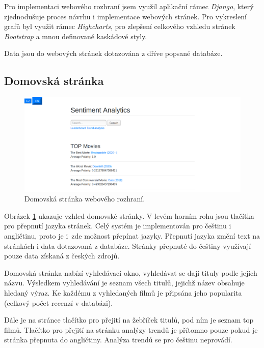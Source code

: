 Pro implementaci webového rozhraní jsem využil aplikační rámec \emph{Django}, který zjednodušuje proces návrhu i implementace webových stránek. Pro vykreslení grafů byl využit rámec \emph{Highcharts}, pro zlepšení celkového vzhledu stránek \emph{Bootstrap} a mnou definované kaskádové styly.

Data jsou do webových stránek dotazována z dříve popsané databáze. 

\subsection{Domovská stránka}
\FloatBarrier
\begin{figure}[!htb]
\label{homepg}
\centering
\includegraphics[width=\textwidth]{homepage.png}
\caption{Domovská stránka webového rozhraní.}
\end{figure}
\FloatBarrier
Obrázek \ref{homepg} ukazuje vzhled domovské stránky. V levém horním rohu jsou tlačítka pro přepnutí jazyka stránek. Celý systém je implementován pro češtinu i angličtinu, proto je i~zde možnost přepínat jazyky. Přepnutí jazyka změní text na stránkách i data dotazovaná z databáze. Stránky přepnuté do češtiny využívají pouze data získaná z českých zdrojů.

Domovská stránka nabízí vyhledávací okno, vyhledávat se dají tituly podle jejich názvu. Výsledkem vyhledávání je seznam všech titulů, jejichž název obsahuje hledaný výraz. Ke každému z vyhledaných filmů je připsána jeho popularita (celkový počet recenzí v databázi). 

Dále je na stránce tlačítko pro přejití na žebříček titulů, pod ním je seznam top filmů. Tlačítko pro přejití na stránku analýzy trendů je přítomno pouze pokud je stránka přepnuta do angličtiny. Analýza trendů se pro češtinu neprovádí.  

\pagebreak
